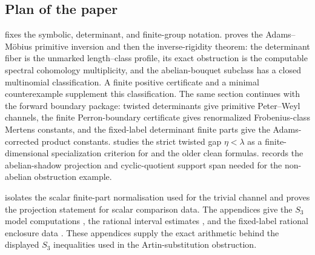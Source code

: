 \subsection{Plan of the paper}

 fixes the symbolic, determinant, and finite-group
notation.   proves the Adams--M\"obius primitive inversion
and then the inverse-rigidity theorem: the determinant fiber is the unmarked
length--class profile, its exact obstruction is the computable spectral
cohomology multiplicity, and the abelian-bouquet subclass has a closed
multinomial classification.  A finite positive certificate and a minimal
counterexample supplement this classification.  The same section continues
with the forward boundary package:
twisted determinants give primitive Peter--Weyl channels, the finite
Perron-boundary certificate gives renormalized Frobenius-class Mertens
constants, and the fixed-label determinant finite parts give the
Adams-corrected product constants.   studies the strict
twisted gap \(\eta<\lambda\) as a finite-dimensional specialization criterion
for  and the older clean formulas.
 records the abelian-shadow projection and cyclic-quotient
support span needed for the non-abelian obstruction example.

 isolates the scalar finite-part normalisation used for
the trivial channel and proves the projection statement for scalar comparison
data.  The appendices give the \(S_3\) model computations
, the rational interval estimates
, and the fixed-label rational enclosure data
.  These appendices supply the exact
arithmetic behind the displayed \(S_3\) inequalities used in the
Artin-substitution obstruction.





